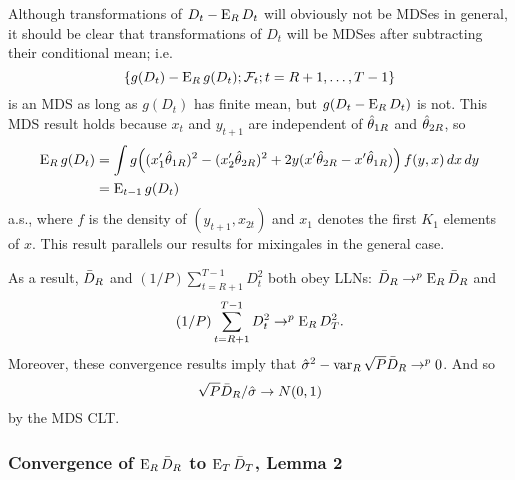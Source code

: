 \documentclass[12pt]{article}
\begin{document}
Although transformations of $D_t - \operatorname{E}_R D_t$ will obviously not be
MDSes in general, it should be clear that transformations of $D_t$
will be MDSes after subtracting their conditional mean; i.e.
\begin{equation*}
  \{g(D_t) - \operatorname{E}_R g(D_t); \mathcal{F}_t; t = R+1,\dots,T-1\}
\end{equation*}
is an MDS as long as
$g(D_t)$ has finite mean, but $g(D_t - \operatorname{E}_R D_t)$ is not. This MDS
result holds because $x_t$ and $y_{t+1}$ are independent of $\hat\theta_{1R}$
and $\hat\theta_{2R}$, so
\begin{equation*}\begin{split}
  \operatorname{E}_R g(D_t)
  &= \int g\Big((x_1'\hat\theta_{1R})^2 - (x_2'\hat\theta_{2R})^2
       + 2 y (x'\hat\theta_{2R} - x'\hat\theta_{1R})\Big) \, f(y, x) \, dx \, dy \\
  &= \operatorname{E}_{t-1} g(D_t)
\end{split}\end{equation*}
a.s., where $f$ is the density of $(y_{t+1}, x_{2t})$ and $x_1$
denotes the first $K_1$ elements of $x$. This result parallels our
results for mixingales in the general case.

As a result, $\bar{D}_{R}$ and $(1/P) \sum_{t=R+1}^{T-1} D_t^2$ both obey
LLNs: $\bar{D}_{R} \to^p \operatorname{E}_R \bar{D}_{R}$ and
\begin{equation*}
  (1/P) \sum_{t=R+1}^{T-1} D_t^2 \to^p \operatorname{E}_R D_T^2.
\end{equation*}
Moreover, these convergence results imply that $\hat{\sigma}^2 - \operatorname{var}_R
\sqrt{P} \bar{D}_{R} \to^p 0$. And so
\begin{equation*}
  \sqrt{P} \bar{D}_{R}/\hat{\sigma} \to N(0,1)
\end{equation*}
by the MDS CLT.

\subsubsection*{Convergence of $\operatorname{E}_R \bar{D}_{R}$ to $\operatorname{E}_T \bar{D}_{T}$, Lemma 2}
\end{document}
